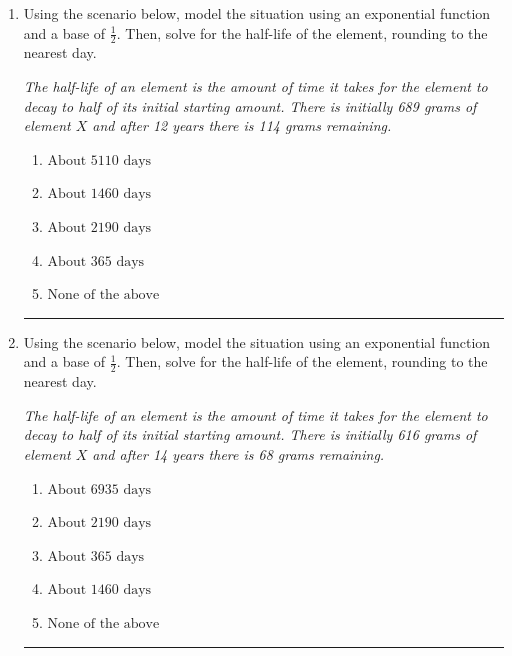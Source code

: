\documentclass[14pt]{extbook}
\newcommand{\litem}[1]{\item#1\hspace*{-1cm}\rule{\textwidth}{0.4pt}}
\begin{document}
\begin{enumerate}
{\begin{enumerate}[label=\Alph*.]
\end{enumerate} }
\litem{
Using the scenario below, model the situation using an exponential function and a base of $\frac{1}{2}$. Then, solve for the half-life of the element, rounding to the nearest day.
\begin{center}
    \textit{ The half-life of an element is the amount of time it takes for the element to decay to half of its initial starting amount. There is initially 689 grams of element $X$ and after 12 years there is 114 grams remaining. }
\end{center}
\begin{enumerate}[label=\Alph*.]
\item \( \text{About } 5110 \text{ days} \)
\item \( \text{About } 1460 \text{ days} \)
\item \( \text{About } 2190 \text{ days} \)
\item \( \text{About } 365 \text{ days} \)
\item \( \text{None of the above} \)

\end{enumerate} }
\litem{
Using the scenario below, model the situation using an exponential function and a base of $\frac{1}{2}$. Then, solve for the half-life of the element, rounding to the nearest day.
\begin{center}
    \textit{ The half-life of an element is the amount of time it takes for the element to decay to half of its initial starting amount. There is initially 616 grams of element $X$ and after 14 years there is 68 grams remaining. }
\end{center}
\begin{enumerate}[label=\Alph*.]
\item \( \text{About } 6935 \text{ days} \)
\item \( \text{About } 2190 \text{ days} \)
\item \( \text{About } 365 \text{ days} \)
\item \( \text{About } 1460 \text{ days} \)
\item \( \text{None of the above} \)


\end{enumerate}}
\end{enumerate}
\end{document}

